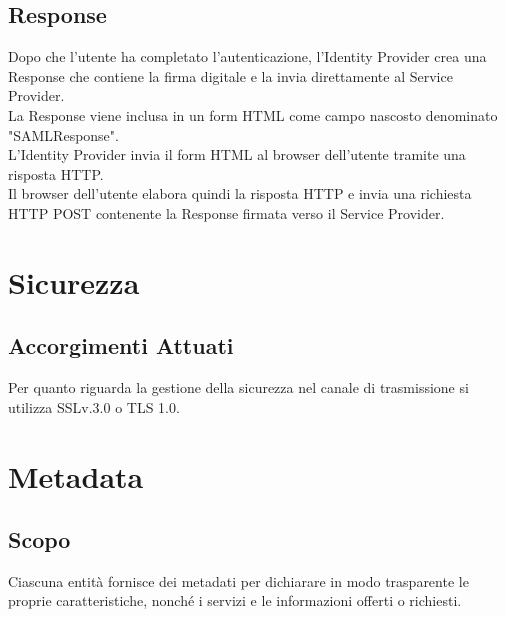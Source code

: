 \subsection{Response}
Dopo che l'utente ha completato l'autenticazione, l'Identity Provider crea una Response che contiene la firma digitale e la invia 
direttamente al Service Provider.
\\ La Response viene inclusa in un form HTML come campo nascosto denominato "SAMLResponse". 
\\ L’Identity Provider invia il form HTML al browser dell’utente tramite una risposta
HTTP.
\\ Il browser dell’utente elabora quindi la risposta HTTP e invia una richiesta HTTP POST
contenente la Response firmata verso il Service Provider.

\section{Sicurezza}
\subsection{Accorgimenti Attuati}
Per quanto riguarda la gestione della sicurezza nel canale di trasmissione
si utilizza SSLv.3.0 o TLS 1.0.


\section{Metadata}
\subsection{Scopo}
Ciascuna entità fornisce dei metadati per dichiarare in modo trasparente le proprie caratteristiche, nonché i servizi e le 
informazioni offerti o richiesti.
